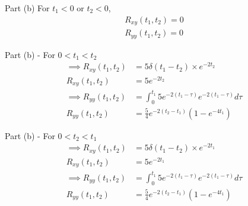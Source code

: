 \documentclass{beamer}
\begin{document}
\begin{frame}{Part (b)}
    For $t_1 < 0$ or $t_2 < 0$,
    \begin{align}
        R_{xy}(t_1,t_2) = 0\\
        R_{yy}(t_1,t_2) = 0
    \end{align}
\end{frame}
\begin{frame}{Part (b) - For $0 < t_1 < t_2$}
    \begin{align}
    \implies R_{xy}(t_1,t_2) &= 5\delta(t_1 - t_2)\times e^{-2t_2}\\
    R_{xy}(t_1,t_2) &= 5e^{-2t_2}\\
    \implies R_{yy}(t_1,t_2) &= \int_0^{t_1}5e^{-2(t_1 - \tau)}e^{-2(t_1 - \tau)}d\tau\\
    R_{yy}(t_1,t_2) &= \frac{5}{4}e^{-2(t_2 - t_1)}(1 - e^{-4t_1})
    \end{align}
\end{frame}
\begin{frame}{Part (b) - For $0 < t_2 < t_1$}
    \begin{align}
    \implies R_{xy}(t_1,t_2) &= 5\delta(t_1 - t_2)\times e^{-2t_1}\\
    R_{xy}(t_1,t_2) &= 5e^{-2t_1}\\
    \implies R_{yy}(t_1,t_2) &= \int_0^{t_1}5e^{-2(t_1 - \tau)}e^{-2(t_1 - \tau)}d\tau\\
    R_{yy}(t_1,t_2) &= \frac{5}{4}e^{-2(t_2 - t_1)}(1 - e^{-4t_1})
    \end{align}
\end{frame}
\end{document}

